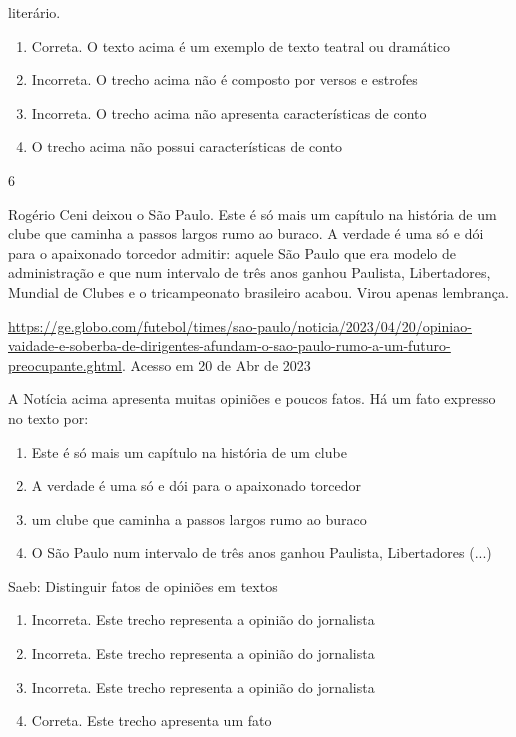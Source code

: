 {{\begin{itemize}
\begin{itemize}
literário.

\begin{enumerate}
\def\labelenumi{\arabic{enumi}.}
\item
  Correta. O texto acima é um exemplo de texto teatral ou dramático
\item
  Incorreta. O trecho acima não é composto por versos e estrofes
\item
  Incorreta. O trecho acima não apresenta características de conto
\item
  O trecho acima não possui características de conto
\end{enumerate}

\num{6}

Rogério Ceni deixou o São Paulo. Este é só mais um capítulo na história
de um clube que caminha a passos largos rumo ao buraco. A verdade é uma
só e dói para o apaixonado torcedor admitir: aquele São Paulo que era
modelo de administração e que num intervalo de três anos ganhou
Paulista, Libertadores, Mundial de Clubes e o tricampeonato brasileiro
acabou. Virou apenas lembrança.

\href{https://ge.globo.com/futebol/times/sao-paulo/noticia/2023/04/20/opiniao-vaidade-e-soberba-de-dirigentes-afundam-o-sao-paulo-rumo-a-um-futuro-preocupante.ghtml}{\uline{https://ge.globo.com/futebol/times/sao-paulo/noticia/2023/04/20/opiniao-vaidade-e-soberba-de-dirigentes-afundam-o-sao-paulo-rumo-a-um-futuro-preocupante.ghtml}}.
Acesso em 20 de Abr de 2023

A Notícia acima apresenta muitas opiniões e poucos fatos. Há um fato
expresso no texto por:

\begin{enumerate}
\def\labelenumi{\alph{enumi})}
\item
  Este é só mais um capítulo na história de um clube
\item
  A verdade é uma só e dói para o apaixonado torcedor
\item
  um clube que caminha a passos largos rumo ao buraco
\item
  O São Paulo num intervalo de três anos ganhou Paulista, Libertadores
  (...)
\end{enumerate}

Saeb: Distinguir fatos de opiniões em textos

\begin{enumerate}
\def\labelenumi{\arabic{enumi}.}
\item
  Incorreta. Este trecho representa a opinião do jornalista
\item
  Incorreta. Este trecho representa a opinião do jornalista
\item
  Incorreta. Este trecho representa a opinião do jornalista
\item
  Correta. Este trecho apresenta um fato
\end{enumerate}


\end{itemize}
\end{itemize}}}
